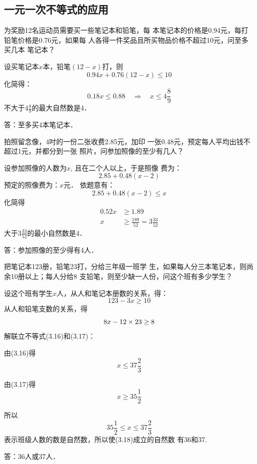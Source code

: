 \subsection{一元一次不等式的应用}

\begin{example}
    为奖励12名运动员需要买一些笔记本和铅笔，每
本笔记本的价格是0.94元，每打铅笔价格是0.76元，如果每
人各得一件奖品且所买物品价格不超过10元，问至多买几本
笔记本？
\end{example}


\begin{solution}
    设买笔记本$x$本，铅笔$(12-x)$打，则
\[0.94x+0.76(12-x)\le 10\]
化简得：
\[0.18x\le 0.88\quad \Rightarrow\quad x\le 4\frac{8}{9}\]
不大于$4\frac{8}{9}$的最大自然数是4．

答：至多买4本笔记本．
\end{solution}
    

    
\begin{example}
    拍照留念像，4吋的一份二张收费2.85元，加印
一张0.48元，预定每人平均出钱不超过1元，并都分到一张
照片，问参加照像的至少有几人？
\end{example}

\begin{solution}
设参加照像的人数为$x$, 且在二个人以上，于是照像
费为：
\[2.85+0.48(x-2)\]
预定的照像费为：$x$元．
依题意有：
\[2.85+0.48(x-2)\le x\]
化简得
\[\begin{split}
    0.52x&\ge 1.89\\
x&\ge \frac{189}{52}=3\frac{33}{52}
\end{split}\]
大于$3\frac{33}{52}$的最小自然数是4．

答：参加照像的至少得有4人．
\end{solution}
    

\begin{example}
把笔记本123册，铅笔23打，分给三年级一班学
生，如果每人分三本笔记本，则尚余10册以上；每人分给8
支铅笔，则至少缺一人份，问这个班有多少学生？
\end{example}

\begin{solution}
 设这个班有学生$x$人，从人和笔记本册数的关系，得：
 \begin{equation}
     123-3x\ge 10
 \end{equation}
从人和铅笔支数的关系，得
\begin{equation}
    8x-12\times 23\ge 8
\end{equation}
解联立不等式(3.16)和(3.17)：

由(3.16)得
\[x\le 37\frac{2}{3}\]

由(3.17)得
\[x\ge 35\frac{1}{2}\]

所以
\begin{equation}
    35\frac{1}{2}\le x\le 37\frac{2}{3}
\end{equation}
表示班级人数的数是自然数，所以使(3.18)成立的自然数
有36和37.

答：36人或37人．
\end{solution}

